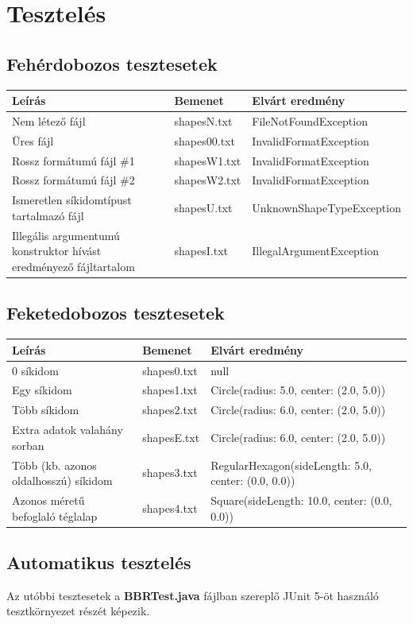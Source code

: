 \documentclass[12pt,a4paper]{article}
\theoremstyle{definition}
\begin{document}
	\section{Tesztelés}
	\subsection{Fehérdobozos tesztesetek}
	\begin{tabularx}{\textwidth}{|X|l|l|}
		\hline
		Leírás & Bemenet & Elvárt eredmény \\
		\hline
		\raggedright Nem létező fájl & shapesN.txt & FileNotFoundException \\
		\hline
		\raggedright Üres fájl & shapes00.txt  & InvalidFormatException \\
		\hline
		\raggedright Rossz formátumú fájl \#1 & shapesW1.txt & InvalidFormatException \\
		\hline
		\raggedright Rossz formátumú fájl \#2 & shapesW2.txt & InvalidFormatException \\
		\hline
		\raggedright Ismeretlen síkidomtípust tartalmazó fájl & shapesU.txt & UnknownShapeTypeException \\
		\hline
		\raggedright Illegális argumentumú konstruktor hívást eredményező fájltartalom & shapesI.txt & IllegalArgumentException \\
		\hline
	\end{tabularx}

	\subsection{Feketedobozos tesztesetek}
		\begin{tabularx}{\textwidth}{| X | l | X |}
		\hline
		Leírás & Bemenet & Elvárt eredmény \\
		\hline
		\raggedright 0 síkidom & shapes0.txt & null \\
		\hline
		\raggedright Egy síkidom  & shapes1.txt & Circle(radius: 5.0, center: (2.0, 5.0)) \\
		\hline
		\raggedright Több síkidom & shapes2.txt & Circle(radius: 6.0, center: (2.0, 5.0)) \\
		\hline
		\raggedright Extra adatok valahány sorban & shapesE.txt & Circle(radius: 6.0, center: (2.0, 5.0)) \\
		\hline
		\raggedright Több (kb. azonos oldalhosszú) síkidom  & shapes3.txt & RegularHexagon(sideLength: 5.0, center: (0.0, 0.0)) \\
		\hline
		\raggedright Azonos méretű \newline befoglaló téglalap & shapes4.txt & Square(sideLength: 10.0, center: (0.0, 0.0)) \\
		\hline 
	\end{tabularx}
	\subsection{Automatikus tesztelés}
	Az utóbbi tesztesetek a \textbf{BBRTest.java} fájlban szereplő JUnit 5-öt használó tesztkörnyezet részét képezik.
\end{document}
